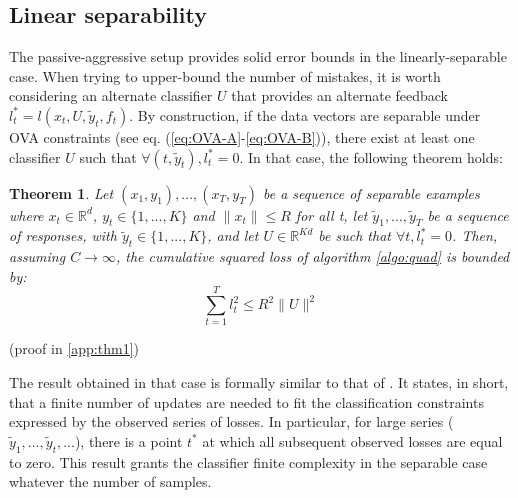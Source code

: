 \documentclass[preprint,12pt,authoryear]{elsarticle}
\newtheorem{theorem}{Theorem}
\begin{document}
\subsection{Linear separability}
The passive-aggressive setup provides solid error bounds in the linearly-separable case. 
When trying to upper-bound the number of mistakes, it is worth considering an alternate classifier $U$ that provides an alternate feedback $l^*_t = l(x_t,U,\tilde{y}_t,f_t)$. By construction, if the data vectors are separable under OVA constraints (see eq. (\ref{eq:OVA-A}-\ref{eq:OVA-B})), there exist at least one classifier $U$ such that $\forall (t, \tilde{y}_t), l^*_t = 0$. In that case, the following theorem holds:




\begin{theorem}
	\label{theo:BPAT1}
	Let $(x_1,y_1),...,(x_T,y_T)$ be a sequence of separable examples where $x_t \in \mathbb{R}^d$, $y_t\in \{1,...,K\}$ and $\parallel x_t\parallel\leqslant R$ for all t, let $\tilde{y}_1,...,\tilde{y}_T$ be a sequence of responses, with $\tilde{y}_t\in \{1,...,K\}$, 
	and let $U \in \mathbb{R}^{K d}$ be such that $ \forall t, l^*_t=0$. Then, assuming $C \rightarrow \infty$, the cumulative squared loss of algorithm \ref{algo:quad} is bounded by:
	\begin{equation}
	\sum_{t=1}^{T} l_t^2 \leqslant R^2 \parallel{U}\parallel^2
	\end{equation}
\end{theorem}
(proof in \ref{app:thm1})

The result obtained in that case is formally similar to that of  \cite{crammer2006online}. It states, in short, that a finite number of updates are needed to fit the classification constraints expressed by the observed series of losses. In particular, for large series ($\tilde{y}_1, ...,\tilde{y}_t, ...$), there is a point $t^*$ at which all subsequent observed losses are equal to zero. This result grants the classifier finite complexity in the separable case whatever the number of samples.
\end{document}
